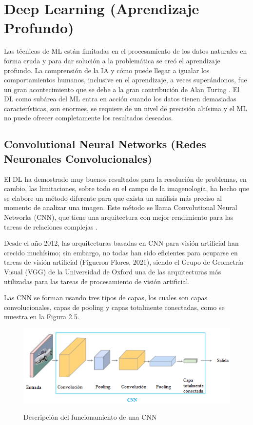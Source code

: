 \doublespacing
\section{Deep Learning (Aprendizaje Profundo)}
Las técnicas de ML están limitadas en el procesamiento de los datos naturales en forma cruda y para dar solución a la problemática se creó el aprendizaje profundo. La comprensión de la IA y cómo puede llegar a igualar los comportamientos humanos, inclusive en el aprendizaje, a veces superándonos, fue un gran acontecimiento que se debe a la gran contribución de Alan Turing \cite{Carola}. El DL como subárea del ML entra en acción cuando los datos tienen demasiadas características, son enormes, se requiere de un nivel de precisión altísima y el ML no puede ofrecer completamente los resultados deseados.\\


\doublespacing
\subsection{Convolutional Neural Networks (Redes Neuronales Convolucionales)}
El DL ha demostrado muy buenos resultados para la resolución de problemas, en cambio, las limitaciones, sobre todo en el campo de la imagenología, ha hecho que se elabore un método diferente para que exista un análisis más preciso al momento de analizar una imagen. Este método se llama Convolutional Neural Networks (CNN), que tiene una arquitectura con mejor rendimiento para las tareas de relaciones complejas \cite{Pena-Torres}. \\
\par Desde el año 2012, las arquitecturas basadas en CNN para visión artificial han crecido muchísimo; sin embargo, no todas han sido eficientes para ocuparse en tareas de visión artificial (Figueroa Flores, 2021), siendo el Grupo de Geometría Visual (VGG) de la Universidad de Oxford \cite{Simonyan2015} una de las arquitecturas más utilizadas para las tareas de procesamiento de visión artificial. \\
\par Las CNN se forman usando tres tipos de capas, los cuales son capas convolucionales, capas de pooling y capas totalmente conectadas, como se muestra en la Figura 2.5.\\

\begin{figure}[H]
	\centering
	\includegraphics[scale=0.7]{img/Marco Teorico/convulcioinales.png}  
	\label{fig:CNN}
	\caption{Descripción del funcionamiento de una CNN}
\end{figure}

